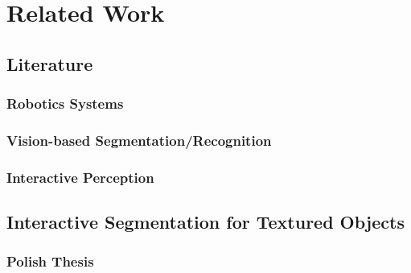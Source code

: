 \chapter{Related Work}
\label{chapter:Related Work}


\section{Literature}
\subsection{Robotics Systems}
\subsection{Vision-based Segmentation/Recognition}
\subsection{Interactive Perception}


\section{Interactive Segmentation for Textured Objects}


\subsection{Polish Thesis}